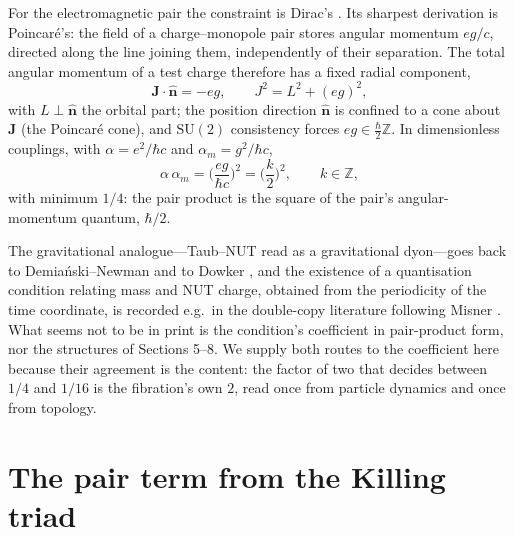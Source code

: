 \documentclass[11pt]{article}
\numberwithin{equation}{section}
\newcommand{\ZZ}{\mathbb{Z}}
\begin{document}
For the electromagnetic pair the constraint is Dirac's \cite{Dirac}. Its
sharpest derivation is Poincar\'e's: the field of a charge--monopole pair
stores angular momentum $eg/c$, directed along the line joining them,
independently of their separation. The total angular momentum of a test
charge therefore has a fixed radial component,
\begin{equation}
\mathbf{J}\cdot\hat{\mathbf{n}}=-eg,
\qquad
J^2=L^2+(eg)^2,
\end{equation}
with $L\perp\hat{\mathbf{n}}$ the orbital part; the position direction
$\hat{\mathbf{n}}$ is confined to a cone about $\mathbf{J}$ (the Poincar\'e
cone), and $\mathrm{SU}(2)$ consistency forces $eg\in\tfrac{\hbar}{2}\ZZ$.
In dimensionless couplings, with $\alpha=e^2/\hbar c$ and
$\alpha_m=g^2/\hbar c$,
\begin{equation}
\alpha\,\alpha_m=\Big(\frac{eg}{\hbar c}\Big)^2=\Big(\frac{k}{2}\Big)^2,
\qquad k\in\ZZ,
\end{equation}
with minimum $1/4$: the pair product is the square of the pair's
angular-momentum quantum, $\hbar/2$.

The gravitational analogue---Taub--NUT \cite{Taub,NTU} read as a
gravitational dyon---goes back to Demia\'nski--Newman and to Dowker
\cite{Dowker}, and the existence of a quantisation condition relating mass
and NUT charge, obtained from the periodicity of the time coordinate, is
recorded e.g.\ in the double-copy literature \cite{LMOW} following Misner
\cite{Misner}. What seems not to be in print is the condition's coefficient
in pair-product form, nor the structures of Sections 5--8. We supply both
routes to the coefficient here because their agreement is the content: the
factor of two that decides between $1/4$ and $1/16$ is the fibration's own
$2$, read once from particle dynamics and once from topology.

\section{The pair term from the Killing triad}
\end{document}
